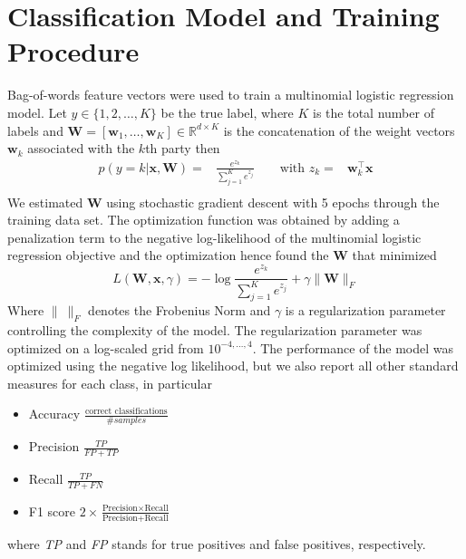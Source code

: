 \documentclass[runningheads,a4paper]{article}
\renewcommand{\vec}[1]{\mathbf{#1}}
\newcommand{\R}{\mathds{R}}
\begin{document}
\section{Classification Model and Training Procedure}\label{sec:model}
Bag-of-words feature vectors were used to train a multinomial logistic regression model. Let $y\in\{1,2,\dots,K\}$ be the true  label, where $K$ is the total number of labels and $\vec{W}=[\vec{w}_1,\dots,\vec{w}_K]\in\R^{d\times K}$ is the concatenation of the weight vectors $\vec{w}_k$ associated with the $k$th party then 
\begin{eqnarray}\label{eq:logreg_multiclass}
p(y=k|\vec{x},\vec{W}) = &\frac{e^{z_k}}{\sum_{j=1}^K e^{z_j}} \qquad \textrm{with }  z_k=&\vec{w}_k^{\top}\vec{x} \\\nonumber
\end{eqnarray}
%
We estimated $\vec{W}$ using stochastic gradient descent with 5 epochs through the training data set. The optimization function was obtained by adding a penalization term to the negative log-likelihood of the multinomial logistic regression objective and the optimization hence found the $\vec{W}$ that minimized
\begin{equation}\label{eq:objective}
L(\vec{W}, \vec{x}, \gamma) = - \log{\frac{e^{z_k}}{\sum_{j=1}^K e^{z_j}}}+ \gamma \| \vec{W} \|_{F}
\end{equation}
Where $\|~\|_F$ denotes the Frobenius Norm and $\gamma$ is a regularization parameter controlling the complexity of the model. 
The regularization parameter was optimized on a log-scaled grid from $10^{-4,\dots,4}$. The performance of the model was optimized using the negative log likelihood, but we also report all other standard measures for each class, in particular 

\begin{itemize}
\item Accuracy $\frac{\text{correct classifications}}{\# samples}$
\item Precision $\frac{TP} {FP + TP}$
\item Recall $\frac{TP}{TP + FN}$
\item F1 score $2\times \frac{\text{Precision} \times \text{Recall}}{\text{Precision} + \text{Recall}}$
\end{itemize}

where \textit{TP} and \textit{FP} stands for true positives and false positives, respectively.
\end{document}
